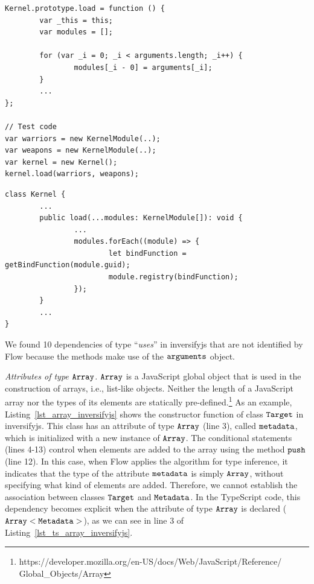 \documentclass[review]{elsarticle}
\newcommand{\aspas}[1]{{``#1''}}
\newcommand{\mcode}[1]{$\tt #1$}
\begin{document}
\begin{lstlisting}[caption=Example of method that uses the built-in object \mcode{arguments}, label=lst_arguments_inversifyjs, emph={[2]arguments},emphstyle={[2]\ttfamily\bfseries\color{darkgreen}}, emph={[3]_bindingDictionary},emphstyle={[3]\ttfamily\bfseries\color{purple}}]
Kernel.prototype.load = function () {
		var _this = this;
		var modules = [];

		for (var _i = 0; _i < arguments.length; _i++) {
				modules[_i - 0] = arguments[_i];
		}
		...
};

// Test code
var warriors = new KernelModule(..);
var weapons = new KernelModule(..);
var kernel = new Kernel();
kernel.load(warriors, weapons);

\end{lstlisting} 

\vspace{0.1cm}

\begin{lstlisting}[caption=TypeScript version of method \mcode{load} from class \mcode{Kernel}, label=lst_ts_load_inversifyjs, emph={[2]KernelModule},emphstyle={[2]\ttfamily\bfseries\color{darkgreen}}]
class Kernel {
		...
		public load(...modules: KernelModule[]): void {
				...
				modules.forEach((module) => {
						let bindFunction = getBindFunction(module.guid);
						module.registry(bindFunction);
				});
		}	
		...
}

\end{lstlisting} 

We found 10 dependencies of type \aspas{\textit{uses}} in {\sc inversifyjs} that are not identified by Flow because the methods make use of the \mcode{arguments} object. 

\vspace{0.3cm}

\noindent \textit{Attributes of type \mcode{Array}.} \mcode{Array} is a JavaScript global object that is used in the construction of arrays, i.e., list-like objects. Neither the length of a JavaScript array nor the types of its elements are statically pre-defined.\footnote{https://developer.mozilla.org/en-US/docs/Web/JavaScript/Reference/ Global\_Objects/Array} As an example, Listing~\ref{lst_array_inversifyjs} shows the constructor function of class \mcode{Target} in {\sc inversifyjs}. This class has an attribute of type \mcode{Array} (line 3), called \mcode{metadata}, which is initialized with a new instance of \mcode{Array}. The conditional statements (lines 4-13) control when elements are added to the array using the method \mcode{push} (line 12). In this case, when Flow applies the algorithm for type inference, it indicates that the type of the attribute \mcode{metadata} is simply \mcode{Array}, without specifying what kind of elements are added. Therefore, we cannot establish the association between classes \mcode{Target} and \mcode{Metadata}. In the TypeScript code, this dependency becomes explicit when the attribute of type \mcode{Array} is declared (\mcode{Array<Metadata>}), as we can see in line 3 of Listing~\ref{lst_ts_array_inversifyjs}. 
\end{document}
